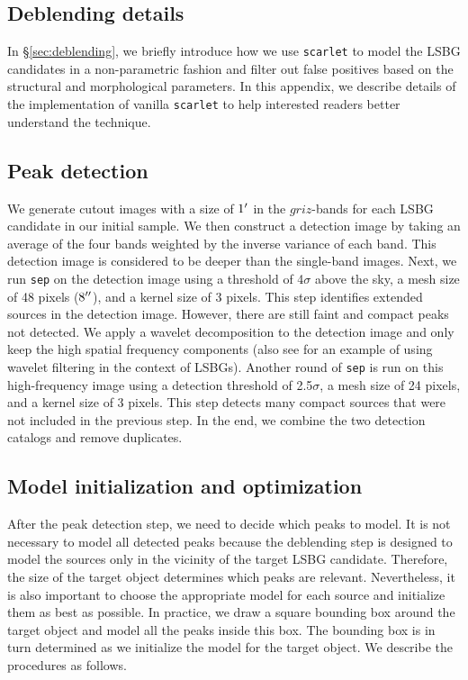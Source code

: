 \documentclass[twocolumn,astrosymb,twocolappendix,linenumbers]{aastex631}
\newcommand{\code}[1]{\texttt{#1}}
\begin{document}
\begin{CJK*}{UTF8}{gbsn}

\section{Deblending details}\label{ap:deblending}
In \S\ref{sec:deblending}, we briefly introduce how we use \code{scarlet} to model the LSBG candidates in a non-parametric fashion and filter out false positives based on the structural and morphological parameters. In this appendix, we describe details of the implementation of vanilla \code{scarlet} to help interested readers better understand the technique.

\subsection{Peak detection}\label{sec:peak}
We generate cutout images with a size of $1\mbox{$^\prime$}$ in the $griz$-bands for each LSBG candidate in our initial sample. We then construct a detection image by taking an average of the four bands weighted by the inverse variance of each band. This detection image is considered to be deeper than the single-band images. 
Next, we run \code{sep} on the detection image using a threshold of 4$\sigma$ above the sky, a mesh size of 48 pixels ($8\mbox{$^{\prime\prime}$}$), and a kernel size of 3 pixels. This step identifies extended sources in the detection image. However, there are still faint and compact peaks not detected. We apply a wavelet decomposition to the detection image \citep{Starck2015} and only keep the high spatial frequency components (also see \citealt{Zaritsky2019} for an example of using wavelet filtering in the context of LSBGs). Another round of \code{sep} is run on this high-frequency image using a detection threshold of 2.5$\sigma$, a mesh size of 24 pixels, and a kernel size of 3 pixels. This step detects many compact sources that were not included in the previous step. In the end, we combine the two detection catalogs and remove duplicates. 

\subsection{Model initialization and optimization}
After the peak detection step, we need to decide which peaks to model. It is not necessary to model all detected peaks because the deblending step is designed to model the sources only in the vicinity of the target LSBG candidate. Therefore, the size of the target object determines which peaks are relevant. Nevertheless, it is also important to choose the appropriate model for each source and initialize them as best as possible. In practice, we draw a square bounding box around the target object and model all the peaks inside this box. The bounding box is in turn determined as we initialize the model for the target object. We describe the procedures as follows. 


\end{CJK*}
\end{document}
